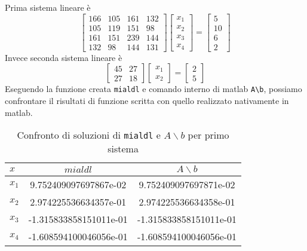Prima sistema lineare è
\[
   \begin{bmatrix}
      166 & 105 & 161 & 132 \\
      105 & 119 & 151 & 98  \\
      161 & 151 & 239 & 144 \\
      132 & 98  & 144 & 131
   \end{bmatrix}
   \begin{bmatrix}
      x_{1} \\
      x_{2} \\
      x_{3} \\
      x_{4}
   \end{bmatrix}
   =
   \begin{bmatrix}
      5  \\
      10 \\
      6  \\
      2
   \end{bmatrix}
\]
Invece seconda sistema lineare è
\[
   \begin{bmatrix}
      45 & 27 \\
      27 & 18
   \end{bmatrix}
   \begin{bmatrix}
      x_{1} \\
      x_{2}
   \end{bmatrix}
   =
   \begin{bmatrix}
      2 \\
      5
   \end{bmatrix}
\]
Eseguendo la funzione creata \lstinline{mialdl} e comando interno di
matlab \lstinline{A\b}, possiamo confrontare il risultati di funzione
scritta con quello realizzato nativamente in matlab.
\begin{table}[ht]
   \centering
   \renewcommand\arraystretch{2}
   \begin{tabular}{|l | c c |}
      \hline
      $x$     & $mialdl$               & $A \backslash b$       \\
      \hline
      $x_{1}$ & 9.752409097697867e-02  & 9.752409097697871e-02  \\
      $x_{2}$ & 2.974225536634357e-01  & 2.974225536634358e-01  \\
      $x_{3}$ & -1.315833858151011e-01 & -1.315833858151011e-01 \\
      $x_{4}$ & -1.608594100046056e-01 & -1.608594100046056e-01 \\
      \hline
   \end{tabular}
   \caption{Confronto di soluzioni di \lstinline{mialdl} e $A \backslash b$ per primo sistema}
   \label{tab:9_1}
\end{table}
